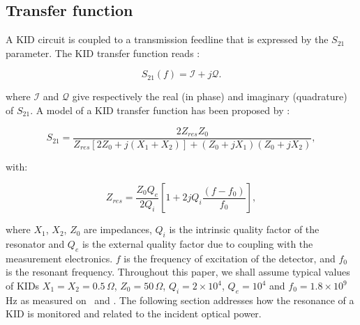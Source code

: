 %
%

\subsection{Transfer function}

A KID circuit is coupled to a transmission feedline that is expressed by the $S_{21}$ parameter. The KID transfer function reads : 

\begin{equation}
S_{21}(f) = \mathcal{I} +j\mathcal{Q} .
\end{equation}

\noindent where $\mathcal{I}$ and $\mathcal{Q}$ give respectively the real (in phase) and imaginary
(quadrature) of $S_{21}$. A model of a KID transfer function has been proposed
by \citet{2008ApPhL..93m4102G} :

\begin{equation}
S_{21} = \frac{2Z_{res}Z_{0}}{Z_{res}[2Z_{0} + j(X_{1}+X_{2})] + (Z_{0} +jX_{1})(Z_{0} +jX_{2})},
\end{equation}

with:

\begin{equation}
Z_{res} = \frac{Z_{0}Q_{e}}{2Q_{i}}[1 + 2jQ_{i}\frac{(f-f_{0})}{f_{0}}],
\end{equation}

\noindent where $X_{1}$, $X_{2}$, $Z_{0}$ are impedances, $Q_{i}$ is the
intrinsic quality factor of the resonator and $Q_{e}$ is the external quality
factor due to coupling with the measurement electronics. $f$ is the frequency of
excitation of the detector, and $f_{0}$ is the resonant frequency. Throughout
this paper, we shall assume typical values of KIDs $X_{1} = X_{2} =
0.5\,\Omega$, $Z_{0} = 50\,\Omega$, $Q_i=2\times 10^4$, $Q_e=10^4$ and $f_{0} =
1.8\times 10^9$\,Hz as measured on \nika\ and \nikad. The following section
addresses how the resonance of a KID is monitored and related to the incident
optical power.

